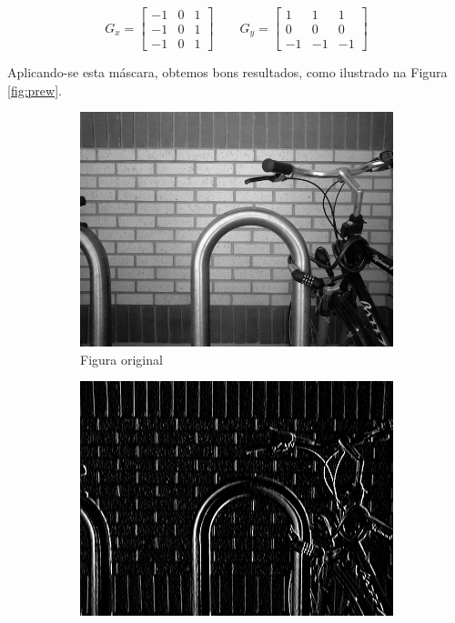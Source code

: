 \documentclass[10pt,a4paper]{article}
\begin{document}
\begin{equation}
  G_x =\left[\begin{array}{ccc}
    -1 & 0 & 1\\
    -1 & 0 & 1\\
    -1 & 0 & 1
  \end{array}\right] \qquad
  G_y =\left[\begin{array}{ccc}
    1 & 1 & 1\\
     0 & 0 & 0\\
    -1 & -1 & -1
  \end{array}\right]
  \label{eq:prewitt}
\end{equation}

Aplicando-se esta máscara, obtemos bons resultados, como ilustrado na Figura \ref{fig:prew}.
\begin{figure}[!ht]
    \centering
    \begin{subfigure}[ht]{0.45\textwidth}
        \includegraphics[width=\textwidth]{src.jpg}
        \caption{Figura original\cite{bike}}
    \end{subfigure}
    \qquad
    \begin{subfigure}[ht]{0.45\textwidth}
        \includegraphics[width=\textwidth]{prewitt_x.jpg}

\end{subfigure}
\end{figure}
\end{document}
